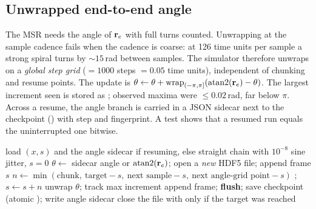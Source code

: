 \documentclass[11pt]{article}
\begin{document}
\subsection{Unwrapped end-to-end angle}
The MSR needs the angle of $\mathbf{r}_e$ with full turns counted. Unwrapping at the sample cadence fails when the cadence is coarse:
at 126 time units per sample a strong spiral turns by $\sim15$\,rad between samples. The simulator therefore unwraps on a \emph{global step grid}
($=1000$ steps $=0.05$ time units), independent of chunking and resume points. The update is
$\theta\gets\theta+\mathrm{wrap}_{(-\pi,\pi]}(\operatorname{atan2}(\mathbf{r}_e)-\theta)$. The largest increment seen is stored as
; observed maxima were $\leq0.02$\,rad, far below $\pi$. Across a resume, the angle branch is carried in a
JSON sidecar next to the checkpoint () with step and fingerprint. A test shows that a resumed run equals the uninterrupted one bitwise.

\begin{algorithm}[H]
\caption{: the sampling, unwrapping and checkpoint loop}
\begin{algorithmic}[1]
\State load $(x,s)$ and the angle sidecar if resuming, else straight chain with $10^{-8}$ sine jitter, $s=0$
\State $\theta\gets$ sidecar angle or $\operatorname{atan2}(\mathbf{r}_e)$; open a \emph{new} HDF5 file; append frame $s$
  \State $n\gets\min(\text{chunk},\ \text{target}-s,\ \text{next sample}-s,\ \text{next angle-grid point}-s)$
  \State {}; $s\gets s+n$
   unwrap $\theta$; track max increment \EndIf
   append frame; \textbf{flush}; save checkpoint (atomic ); write angle sidecar \EndIf
\EndWhile
\State close the file with  only if the target was reached
\end{algorithmic}
\end{algorithm}

\end{document}
